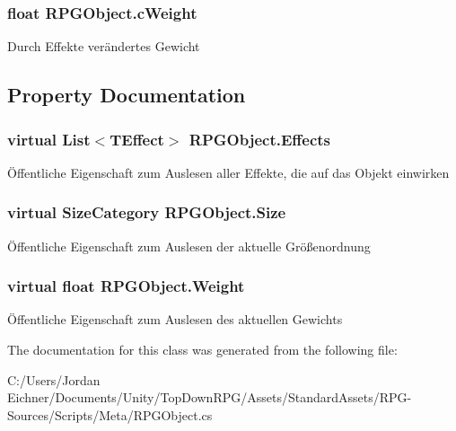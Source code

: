\subsubsection[{c\+Weight}]{\setlength{\rightskip}{0pt plus 5cm}float R\+P\+G\+Object.\+c\+Weight\hspace{0.3cm}{\ttfamily [protected]}}\label{class_r_p_g_object_a098dcfa4772557888348f5164da509f8}
Durch Effekte verändertes Gewicht 

\subsection{Property Documentation}
\hypertarget{class_r_p_g_object_ac13bdb9e5988e9eff18e5f6f5b613bb6}{}
\subsubsection[{Effects}]{\setlength{\rightskip}{0pt plus 5cm}virtual List$<${\bf T\+Effect}$>$ R\+P\+G\+Object.\+Effects\hspace{0.3cm}{\ttfamily [get]}}\label{class_r_p_g_object_ac13bdb9e5988e9eff18e5f6f5b613bb6}
Öffentliche Eigenschaft zum Auslesen aller Effekte, die auf das Objekt einwirken \hypertarget{class_r_p_g_object_ad4fe72a3a4621618a563219805ede17d}{}
\subsubsection[{Size}]{\setlength{\rightskip}{0pt plus 5cm}virtual Size\+Category R\+P\+G\+Object.\+Size\hspace{0.3cm}{\ttfamily [get]}}\label{class_r_p_g_object_ad4fe72a3a4621618a563219805ede17d}
Öffentliche Eigenschaft zum Auslesen der aktuelle Größenordnung \hypertarget{class_r_p_g_object_af627383d88885ca597a549cb52e4b242}{}
\subsubsection[{Weight}]{\setlength{\rightskip}{0pt plus 5cm}virtual float R\+P\+G\+Object.\+Weight\hspace{0.3cm}{\ttfamily [get]}}\label{class_r_p_g_object_af627383d88885ca597a549cb52e4b242}
Öffentliche Eigenschaft zum Auslesen des aktuellen Gewichts 

The documentation for this class was generated from the following file\+:\begin{DoxyCompactItemize}
\item 
C\+:/\+Users/\+Jordan Eichner/\+Documents/\+Unity/\+Top\+Down\+R\+P\+G/\+Assets/\+Standard\+Assets/\+R\+P\+G-\/\+Sources/\+Scripts/\+Meta/R\+P\+G\+Object.\+cs\end{DoxyCompactItemize}

